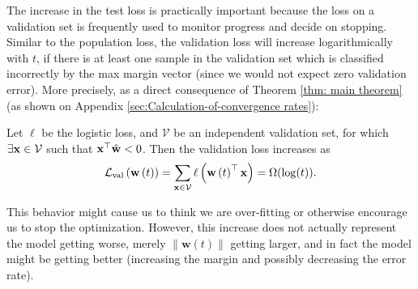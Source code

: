 \documentclass[twoside,11pt,english]{article}
\newcommand{\norm}[1]{\left\lVert{#1}\right\rVert}
\begin{document}
The increase in the test loss is practically important because the
loss on a validation set is frequently used to monitor progress and
decide on stopping. Similar to the population loss, the validation
loss will increase
logarithmically with $t$, if there is at least one sample in the validation set which is classified incorrectly by the max margin vector (since we would not expect zero validation
error). More precisely, as a direct consequence of Theorem \ref{thm: main theorem} (as shown on Appendix \ref{sec:Calculation-of-convergence rates}):
\begin{corR}
Let $\ell$ be the logistic loss, and $\mathcal{V}$ be an independent validation set, for which $\exists \mathbf{x}\in \mathcal{V}$ such that $\mathbf{x}^{\top} \hat{\mathbf{w}} < 0$. Then the validation loss increases as
\[\mathcal{L}_{\mathrm{val}}\left(\mathbf{w}\left(t\right)\right)=\sum_{\mathbf{x}\in\mathcal{V}}\ell\left(\mathbf{w}\left(t\right)^{\top}\mathbf{x}\right)=\Omega(\log (t) ).\]
\end{corR}

This behavior might cause us to think we are over-fitting or otherwise
encourage us to stop the optimization. However, this increase does not
actually represent the model getting worse, merely $\norm{\mathbf{w}(t)}$
getting larger, and in fact the model might be getting better (increasing the margin and possibly decreasing the error rate).
\end{document}
